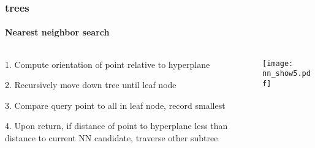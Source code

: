 \begin{frame}[noframenumbering]
  \frametitle{\kd trees}
  \framesubtitle{Nearest neighbor search}
  \begin{columns}[T]
    \begin{column}{.5\textwidth}
      \begin{block}{}%
        {\color{white} 1.\hspace{1mm} Compute orientation of point relative to hyperplane
          \\\vspace{0.4cm}

        {\color{graph-red}
        2.\hspace{1mm} Recursively move down tree until leaf node}\\\vspace{0.4cm}

        3.\hspace{1mm} Compare query point to all in leaf node, record smallest\\\vspace{0.4cm}
    
        4.\hspace{1mm} Upon return, if distance of point to hyperplane less than distance to current
          NN candidate, traverse other subtree}
      \end{block}
    \end{column}
    \begin{column}{.5\textwidth}
      \begin{block}{}
        \texttt{[image: nn\_show5.pdf]}
      \end{block}
    \end{column}
  \end{columns}
\end{frame}
